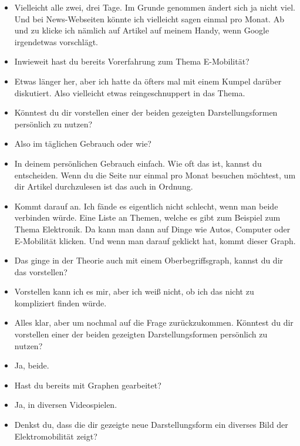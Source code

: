{\begin{itemize}[]
            \item {} Vielleicht alle zwei, drei Tage. Im Grunde genommen ändert sich ja nicht viel.
                  Und bei News-Webseiten könnte ich vielleicht sagen einmal pro Monat.
                  Ab und zu klicke ich nämlich auf Artikel auf meinem Handy, wenn Google irgendetwas vorschlägt.
            \item {} Inwieweit hast du bereits Vorerfahrung zum Thema E-Mobilität?
            \item {} Etwas länger her, aber ich hatte da öfters mal mit einem Kumpel darüber diskutiert.
                  Also vielleicht etwas reingeschnuppert in das Thema.
            \item {} Könntest du dir vorstellen einer der beiden gezeigten Darstellungsformen persönlich zu nutzen?
            \item {} Also im täglichen Gebrauch oder wie?
            \item {} In deinem persönlichen Gebrauch einfach.
                  Wie oft das ist, kannst du entscheiden.
                  Wenn du die Seite nur einmal pro Monat besuchen möchtest, um dir Artikel durchzulesen ist das auch in Ordnung.
            \item {} Kommt darauf an. Ich fände es eigentlich nicht schlecht, wenn man beide verbinden würde.
                  Eine Liste an Themen, welche es gibt zum Beispiel zum Thema Elektronik.
                  Da kann man dann auf Dinge wie Autos, Computer oder E-Mobilität klicken.
                  Und wenn man darauf geklickt hat, kommt dieser Graph.
            \item {} Das ginge in der Theorie auch mit einem Oberbegriffsgraph, kannst du dir das vorstellen?
            \item {} Vorstellen kann ich es mir, aber ich weiß nicht, ob ich das nicht zu kompliziert finden würde.
            \item {} Alles klar, aber um nochmal auf die Frage zurückzukommen.
                  Könntest du dir vorstellen einer der beiden gezeigten Darstellungsformen persönlich zu nutzen?
            \item {} Ja, beide.
            \item {} Hast du bereits mit Graphen gearbeitet?
            \item {} Ja, in diversen Videospielen.
            \item {} Denkst du, dass die dir gezeigte neue Darstellungsform ein diverses Bild der Elektromobilität zeigt?

\end{itemize}}
